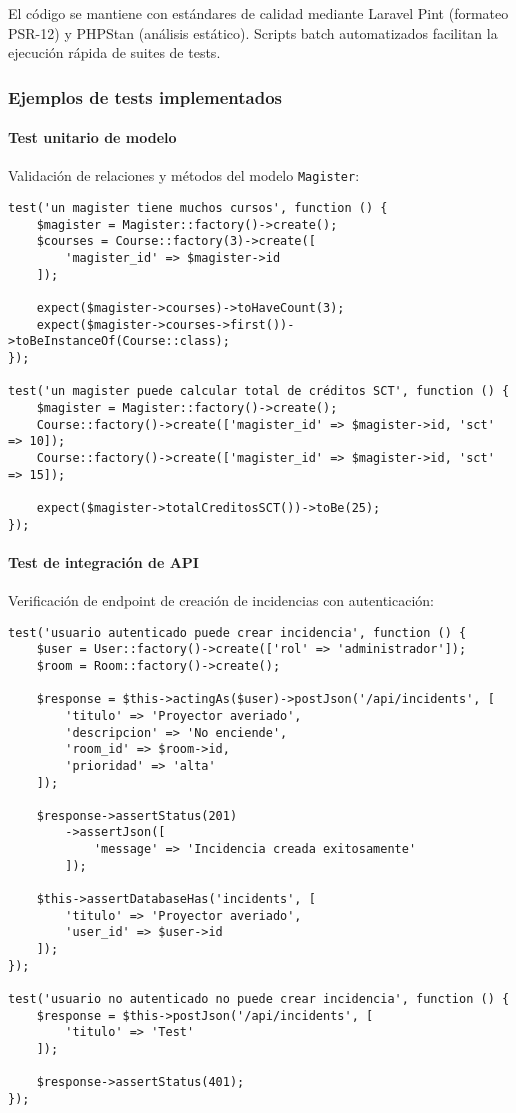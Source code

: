El código se mantiene con estándares de calidad mediante Laravel Pint (formateo PSR-12) y PHPStan (análisis estático). Scripts batch automatizados facilitan la ejecución rápida de suites de tests.

\subsubsection{Ejemplos de tests implementados}

\paragraph{Test unitario de modelo}

Validación de relaciones y métodos del modelo \texttt{Magister}:

\begin{verbatim}
test('un magister tiene muchos cursos', function () {
    $magister = Magister::factory()->create();
    $courses = Course::factory(3)->create([
        'magister_id' => $magister->id
    ]);
    
    expect($magister->courses)->toHaveCount(3);
    expect($magister->courses->first())->toBeInstanceOf(Course::class);
});

test('un magister puede calcular total de créditos SCT', function () {
    $magister = Magister::factory()->create();
    Course::factory()->create(['magister_id' => $magister->id, 'sct' => 10]);
    Course::factory()->create(['magister_id' => $magister->id, 'sct' => 15]);
    
    expect($magister->totalCreditosSCT())->toBe(25);
});
\end{verbatim}

\paragraph{Test de integración de API}

Verificación de endpoint de creación de incidencias con autenticación:

\begin{verbatim}
test('usuario autenticado puede crear incidencia', function () {
    $user = User::factory()->create(['rol' => 'administrador']);
    $room = Room::factory()->create();
    
    $response = $this->actingAs($user)->postJson('/api/incidents', [
        'titulo' => 'Proyector averiado',
        'descripcion' => 'No enciende',
        'room_id' => $room->id,
        'prioridad' => 'alta'
    ]);
    
    $response->assertStatus(201)
        ->assertJson([
            'message' => 'Incidencia creada exitosamente'
        ]);
        
    $this->assertDatabaseHas('incidents', [
        'titulo' => 'Proyector averiado',
        'user_id' => $user->id
    ]);
});

test('usuario no autenticado no puede crear incidencia', function () {
    $response = $this->postJson('/api/incidents', [
        'titulo' => 'Test'
    ]);
    
    $response->assertStatus(401);
});
\end{verbatim}

